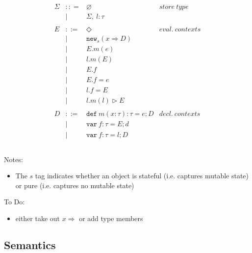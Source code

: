 \documentclass{llncs}
\newcommand{\keywadj}[1]{\mathtt{#1}}
\newcommand{\keyw}[1]{\keywadj{#1}~}
\begin{document}
\[\begin{array}{lll}
\begin{array}{lllr}
&&\\
\Sigma & :: = & \varnothing & store~type\\
& | & \Sigma,~l : \tau\\
&&\\
E & ::= & \Diamond & eval.~ contexts\\
  & |   & \keywadj{new}_{s}(x \Rightarrow D) \\
  & |   & E.m(e)\\
  & |   & l.m(E)\\
  & |   & E.f \\
  & |   & E.f = e \\
  & |   & l.f = E \\
  & |   & l.m(l) \rhd E \\
&&\\
D & ::= & \keyw{def} m(x:\tau):\tau = e; D & decl.~ contexts\\
  & |   & \keyw{var} f:\tau = E; d \\
  & |   & \keyw{var} f:\tau = l; D \\
&&\\
\end{array}
\end{array}
\]

Notes:

\begin{itemize}
\item The $s$ tag indicates whether an object is stateful (i.e. captures mutable state) or pure (i.e. captures no mutable state)
\end{itemize}

To Do:

\begin{itemize}
\item either take out $x \Rightarrow$ or add type members
\end{itemize}

\newpage

\subsection{Semantics}
\end{document}
